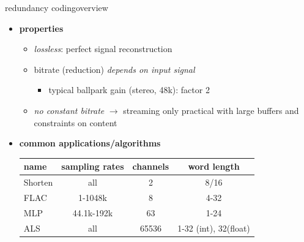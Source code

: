 	\begin{frame}{redundancy coding}{overview}	
		\begin{itemize}
			\item	\textbf{properties}
				\begin{itemize}
					\item	\textit{lossless}: perfect signal reconstruction
					\smallskip
                    \item	bitrate (reduction) \textit{depends on input signal}
						\begin{itemize}
							\item	typical ballpark gain (stereo, 48k): factor 2
						\end{itemize}
					\smallskip
                    \item	\textit{no constant bitrate} $\rightarrow$ streaming only practical with large buffers and constraints on content
				\end{itemize}
			\pause
            \bigskip
			\item	\textbf{common applications/algorithms}
			\begin{table}
			\centering
				\begin{footnotesize}
					\begin{tabular}{lccc}
					\hline
						\textbf{name} & \textbf{sampling rates}	& \textbf{channels}	& \textbf{word length} \\
					\hline
					Shorten	& all 			& 2 	& 8/16\\
					FLAC 	& 1-1048k 		& 8 	& 4-32\\
					MLP 	& 44.1k-192k	& 63 	& 1-24\\
					ALS 	& all 			& 65536	& 1-32 (int), 32(float)\\
					\end{tabular}  
				\end{footnotesize}
			\end{table}
		\end{itemize}		
	\end{frame}

	
	



